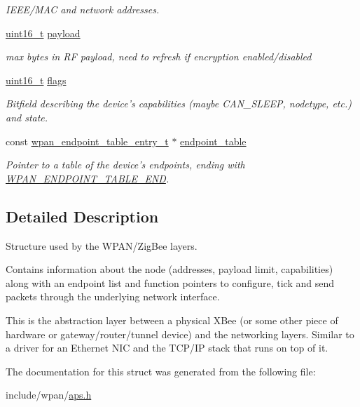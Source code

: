 \begin{DoxyCompactItemize}
\begin{DoxyCompactList}\small\item\em I\-E\-E\-E/\-M\-A\-C and network addresses. \end{DoxyCompactList}\item 
\hypertarget{group__wpan__aps_ga27ab4ae0aba390adfd9907aeebd88b9c}{\hyperlink{group__hal_ga5a8b2dc9e45a9ee81a94ef304fb62505}{uint16\-\_\-t} \hyperlink{group__wpan__aps_ga27ab4ae0aba390adfd9907aeebd88b9c}{payload}}\label{group__wpan__aps_ga27ab4ae0aba390adfd9907aeebd88b9c}

\begin{DoxyCompactList}\small\item\em max bytes in R\-F payload, need to refresh if encryption enabled/disabled \end{DoxyCompactList}\item 
\hyperlink{group__hal_ga5a8b2dc9e45a9ee81a94ef304fb62505}{uint16\-\_\-t} \hyperlink{group__wpan__aps_ga1e87af3c18a2fd36c61faf89949bdc3f}{flags}
\begin{DoxyCompactList}\small\item\em Bitfield describing the device's capabilities (maybe C\-A\-N\-\_\-\-S\-L\-E\-E\-P, nodetype, etc.) and state. \end{DoxyCompactList}\item 
const \hyperlink{structwpan__endpoint__table__entry__t}{wpan\-\_\-endpoint\-\_\-table\-\_\-entry\-\_\-t} $\ast$ \hyperlink{group__wpan__aps_gad7c834ea25a2f008caaf40ec08aa5a86}{endpoint\-\_\-table}
\begin{DoxyCompactList}\small\item\em Pointer to a table of the device's endpoints, ending with \hyperlink{group__wpan__aps_gaac571cafa96f8201c714feb0634afa92}{W\-P\-A\-N\-\_\-\-E\-N\-D\-P\-O\-I\-N\-T\-\_\-\-T\-A\-B\-L\-E\-\_\-\-E\-N\-D}. \end{DoxyCompactList}\end{DoxyCompactItemize}


\subsection{Detailed Description}
Structure used by the W\-P\-A\-N/\-Zig\-Bee layers. 

Contains information about the node (addresses, payload limit, capabilities) along with an endpoint list and function pointers to configure, tick and send packets through the underlying network interface.

This is the abstraction layer between a physical X\-Bee (or some other piece of hardware or gateway/router/tunnel device) and the networking layers. Similar to a driver for an Ethernet N\-I\-C and the T\-C\-P/\-I\-P stack that runs on top of it. 

The documentation for this struct was generated from the following file\-:\begin{DoxyCompactItemize}
\item 
include/wpan/\hyperlink{aps_8h}{aps.\-h}\end{DoxyCompactItemize}
